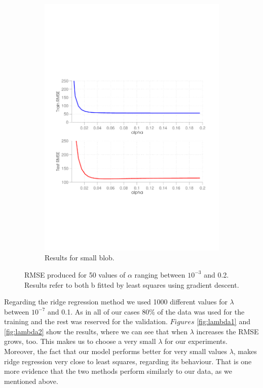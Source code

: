\begin{figure}[ht]
\begin{subfigure}[b]{0.45\textwidth}
    \includegraphics[width=\textwidth]{figures/alpha_curve2.pdf}
    \caption{Results for small blob.}
    \label{fig:alpha2}
  \end{subfigure}
  \caption{RMSE produced for 50 values of $\alpha$ ranging between $10^{-3}$ and 0.2. Results refer to both b fitted by least squares using gradient descent.}
\end{figure}

Regarding the ridge regression method we used 1000 different values for $\lambda$ between $10^{-7}$ and 0.1. As in all of our cases 80\% of the data was used for the training and the rest was reserved for the validation. $Figures$ \ref{fig:lambda1} and \ref{fig:lambda2} show the results, where we can see that when $\lambda$ increases the RMSE grows, too. This makes us to choose a very small $\lambda$ for our experiments. Moreover, the fact that our model performs better for very small values $\lambda$, makes ridge regression very close to least squares, regarding its behaviour. That is one more evidence that the two methods perform similarly to our data, as we mentioned above.

